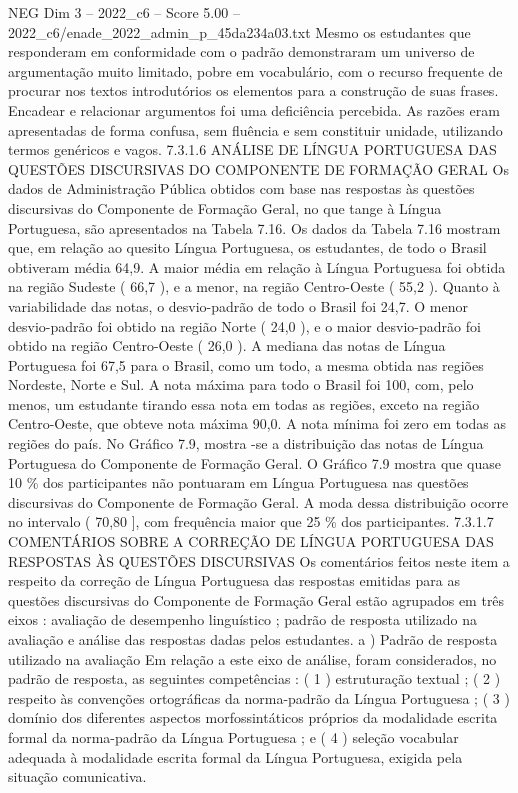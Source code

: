 \begin{textsample}{NEG Dim 3 – 2022\_c6 – Score 5.00 – 2022\_c6/enade\_2022\_admin\_p\_45da234a03.txt}
Mesmo os estudantes que responderam em conformidade com o padrão demonstraram um universo de argumentação muito limitado, pobre em vocabulário, com o recurso frequente de procurar nos textos introdutórios os elementos para a construção de suas frases.
Encadear e relacionar argumentos foi uma deficiência percebida.
As razões eram apresentadas de forma confusa, sem fluência e sem constituir unidade, utilizando termos genéricos e vagos. 7.3.1.6 ANÁLISE DE LÍNGUA PORTUGUESA DAS QUESTÕES DISCURSIVAS DO COMPONENTE DE FORMAÇÃO GERAL Os dados de Administração Pública obtidos com base nas respostas às questões discursivas do Componente de Formação Geral, no que tange à Língua Portuguesa, são apresentados na Tabela 7.16.
Os dados da Tabela 7.16 mostram que, em relação ao quesito Língua Portuguesa, os estudantes, de todo o Brasil obtiveram média 64,9.
A maior média em relação à Língua Portuguesa foi obtida na região Sudeste ( 66,7 ), e a menor, na região Centro-Oeste ( 55,2 ).
Quanto à variabilidade das notas, o desvio-padrão de todo o Brasil foi 24,7.
O menor desvio-padrão foi obtido na região Norte ( 24,0 ), e o maior desvio-padrão foi obtido na região Centro-Oeste ( 26,0 ).
A mediana das notas de Língua Portuguesa foi 67,5 para o Brasil, como um todo, a mesma obtida nas regiões Nordeste, Norte e Sul.
A nota máxima para todo o Brasil foi 100, com, pelo menos, um estudante tirando essa nota em todas as regiões, exceto na região Centro-Oeste, que obteve nota máxima 90,0.
A nota mínima foi zero em todas as regiões do país.
No Gráfico 7.9, mostra -se a distribuição das notas de Língua Portuguesa do Componente de Formação Geral.
O Gráfico 7.9 mostra que quase 10 \% dos participantes não pontuaram em Língua Portuguesa nas questões discursivas do Componente de Formação Geral.
A moda dessa distribuição ocorre no intervalo ( 70,80 ], com frequência maior que 25 \% dos participantes. 7.3.1.7 COMENTÁRIOS SOBRE A CORREÇÃO DE LÍNGUA PORTUGUESA DAS RESPOSTAS ÀS QUESTÕES DISCURSIVAS Os comentários feitos neste item a respeito da correção de Língua Portuguesa das respostas emitidas para as questões discursivas do Componente de Formação Geral estão agrupados em três eixos : avaliação de desempenho linguístico ; padrão de resposta utilizado na avaliação e análise das respostas dadas pelos estudantes. a ) Padrão de resposta utilizado na avaliação Em relação a este eixo de análise, foram considerados, no padrão de resposta, as seguintes competências : ( 1 ) estruturação textual ; ( 2 ) respeito às convenções ortográficas da norma-padrão da Língua Portuguesa ; ( 3 ) domínio dos diferentes aspectos morfossintáticos próprios da modalidade escrita formal da norma-padrão da Língua Portuguesa ; e ( 4 ) seleção vocabular adequada à modalidade escrita formal da Língua Portuguesa, exigida pela situação comunicativa.

\end{textsample}
